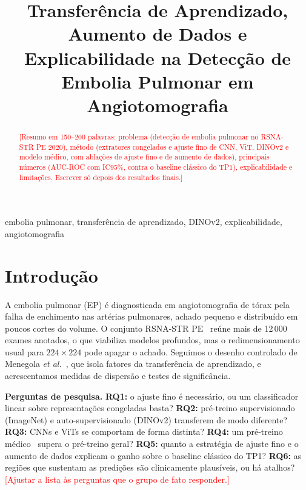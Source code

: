 \documentclass[conference]{IEEEtran}
\newcommand{\pend}[1]{\textcolor{red}{[#1]}}
\begin{document}
\title{Transferência de Aprendizado, Aumento de Dados e Explicabilidade na Detecção de Embolia Pulmonar em Angiotomografia}

\author{
}

\maketitle

\begin{abstract}
\pend{Resumo em 150--200 palavras: problema (detecção de embolia pulmonar no RSNA-STR PE 2020), método (extratores congelados e ajuste fino de CNN, ViT, DINOv2 e modelo médico, com ablações de ajuste fino e de aumento de dados), principais números (AUC-ROC com IC95\%, contra o baseline clássico do TP1), explicabilidade e limitações. Escrever só depois dos resultados finais.}
\end{abstract}

\begin{IEEEkeywords}
embolia pulmonar, transferência de aprendizado, DINOv2, explicabilidade, angiotomografia
\end{IEEEkeywords}

\section{Introdução}
A embolia pulmonar (EP) é diagnosticada em angiotomografia de tórax pela falha de enchimento nas artérias pulmonares, achado pequeno e distribuído em poucos cortes do volume. O conjunto RSNA-STR PE~\cite{colak2021} reúne mais de 12\,000 exames anotados, o que viabiliza modelos profundos, mas o redimensionamento usual para $224\times224$ pode apagar o achado. Seguimos o desenho controlado de Menegola \textit{et al.}~\cite{menegola2017}, que isola fatores da transferência de aprendizado, e acrescentamos medidas de dispersão e testes de significância.

\textbf{Perguntas de pesquisa.}
\textbf{RQ1:} o ajuste fino é necessário, ou um classificador linear sobre representações congeladas basta?
\textbf{RQ2:} pré-treino supervisionado (ImageNet) e auto-supervisionado (DINOv2) transferem de modo diferente?
\textbf{RQ3:} CNNs e ViTs se comportam de forma distinta?
\textbf{RQ4:} um pré-treino médico~\cite{mei2022} supera o pré-treino geral?
\textbf{RQ5:} quanto a estratégia de ajuste fino e o aumento de dados explicam o ganho sobre o baseline clássico do TP1?
\textbf{RQ6:} as regiões que sustentam as predições são clinicamente plausíveis, ou há atalhos?
\pend{Ajustar a lista às perguntas que o grupo de fato responder.}
\end{document}

